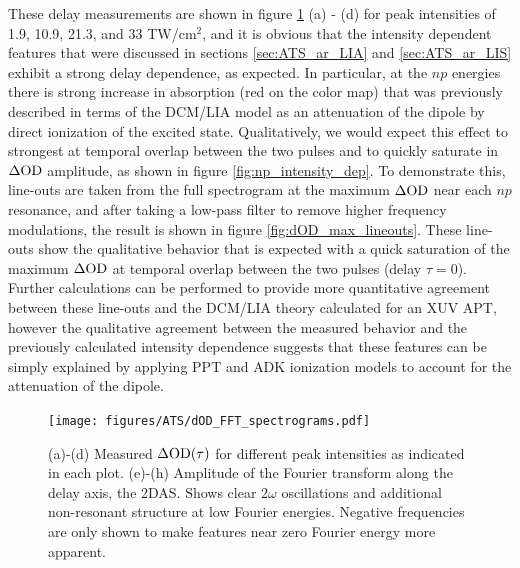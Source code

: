 These delay measurements are shown in figure \ref{fig:dod_fft_spectrograms} (a) - (d) for peak intensities of 1.9, 10.9, 21.3, and 33 TW/cm$^{2}$, and it is obvious that the intensity dependent features that were discussed in sections \ref{sec:ATS_ar_LIA} and \ref{sec:ATS_ar_LIS} exhibit a strong delay dependence, as expected.  In particular, at the $np$ energies there is strong increase in absorption (red on the color map) that was previously described in terms of the DCM/LIA model as an attenuation of the dipole by direct ionization of the excited state. Qualitatively, we would expect this effect to strongest at temporal overlap between the two pulses and to quickly saturate in $\dod$ amplitude, as shown in figure \ref{fig:np_intensity_dep}.  To demonstrate this, line-outs are taken from the full spectrogram at the maximum $\dod$ near each $np$ resonance, and after taking a low-pass filter to remove higher frequency modulations, the result is shown in figure \ref{fig:dOD_max_lineouts}.  These line-outs show the qualitative behavior that is expected with a quick saturation of the maximum $\dod$ at temporal overlap between the two pulses (delay $\tau=0$).  Further calculations can be performed to provide more quantitative agreement between these line-outs and the DCM/LIA theory calculated for an XUV APT, however the qualitative agreement between the measured behavior and the previously calculated intensity dependence suggests that these features can be simply explained by applying PPT and ADK ionization models to account for the attenuation of the dipole.



\begin{figure}%
	\texttt{[image: figures/ATS/dOD\_FFT\_spectrograms.pdf]}
	\caption[Delay dependent $\dod$ and corresponding Fourier transform]{(a)-(d) Measured $\Delta\mathrm{OD}(\tau)$ for different peak intensities as indicated in each plot. (e)-(h) Amplitude of the Fourier transform along the delay axis, the 2DAS.  Shows clear $2\omega$ oscillations and additional non-resonant structure at low Fourier energies.  Negative frequencies are only shown to make features near zero Fourier energy more apparent.}
	\label{fig:dod_fft_spectrograms}
\end{figure}

